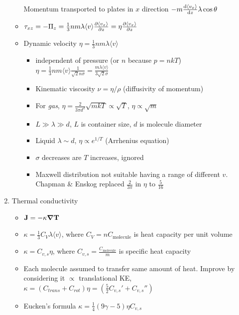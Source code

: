 \documentclass{article}
\theoremstyle{remark}
\begin{document}
\begin{enumerate}
\begin{itemize}
                    Momentum transported to plates in $x$ direction $-m\dv{\langle v_x\rangle}{z}\lambda\cos\theta$
            \item $\tau_{xz}=-\Pi_z=\frac{1}{3}nm\lambda\langle v\rangle\pdv{\langle v_x\rangle}{z}=\eta\pdv{\langle v_x\rangle}{z}$
            \item Dynamic velocity $\boxed{\eta=\frac{1}{3}nm\lambda\langle v\rangle}$\begin{itemize}
                    \item independent of pressure (or $n$ because $p=nkT$)\\
                        $\eta=\frac{1}{3}nm\langle v\rangle\frac{1}{\sqrt{2}n\sigma}=\frac{m\lambda\langle v\rangle}{3\sqrt{2}\sigma}$
                    \item Kinematic viscosity $\nu=\eta/\rho$ (diffusivity of momentum)
                    \item For \emph{gas}, $\eta=\frac{2}{3\pi d^2}\sqrt{mkT}\propto\sqrt{T}$, $\eta\propto\sqrt{m}$
                    \item $L\gg\lambda\gg d$, $L$ is container size, $d$ is molecule diameter
                    \item Liquid $\lambda\sim d$, $\eta\propto e^{1/T}$ (Arrhenius equation)
                    \item $\sigma$ decreases are $T$ increases, ignored
                    \item Maxwell distribution not suitable having a range of different $v$. Chapman \& Enskog replaced $\frac{2}{3\pi}$ in $\eta$ to $\frac{5}{16}$
                \end{itemize}
        \end{itemize}
    \item Thermal conductivity\begin{itemize}
            \item $\vb{J}=-\kappa\grad\vb{T}$
            \item $\boxed{\kappa=\frac{1}{3}C_V\lambda\langle v\rangle}$, where $\boxed{C_V=nC_{\text{molecule}}}$ is heat capacity per unit volume
            \item $\boxed{\kappa=C_{v,s}\eta}$, where $C_{v,s}=\frac{C_{\text{molecule}}}{m}$ is specific heat capacity
            \item Each molecule assumed to transfer same amount of heat. Improve by considering it $\propto$ translational KE, $\kappa=(C_{trans}+C_{rot})\eta = (\frac{5}{2}C_{v,s}'+C_{v,s}'')$
            \item Eucken's formula $\kappa=\frac{1}{4}(9\gamma-5)\eta C_{v,s}$

\end{itemize}
\end{enumerate}
\end{document}
